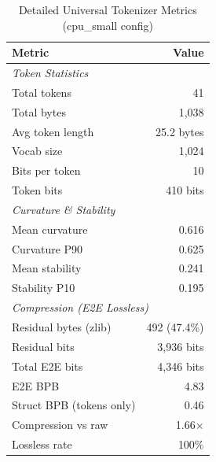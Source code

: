 \begin{table}[h]
\centering
\caption{Detailed Universal Tokenizer Metrics (cpu\_small config)}
\label{tab:detailed}
\begin{tabular}{lr}
\toprule
Metric & Value \\
\midrule
\multicolumn{2}{l}{\textit{Token Statistics}} \\
Total tokens & 41 \\
Total bytes & 1,038 \\
Avg token length & 25.2 bytes \\
Vocab size & 1,024 \\
Bits per token & 10 \\
Token bits & 410 bits \\
\midrule
\multicolumn{2}{l}{\textit{Curvature \& Stability}} \\
Mean curvature & 0.616 \\
Curvature P90 & 0.625 \\
Mean stability & 0.241 \\
Stability P10 & 0.195 \\
\midrule
\multicolumn{2}{l}{\textit{Compression (E2E Lossless)}} \\
Residual bytes (zlib) & 492 (47.4\%) \\
Residual bits & 3,936 bits \\
Total E2E bits & 4,346 bits \\
E2E BPB & 4.83 \\
Struct BPB (tokens only) & 0.46 \\
Compression vs raw & 1.66$\times$ \\
Lossless rate & 100\% \\
\bottomrule
\end{tabular}
\end{table}

